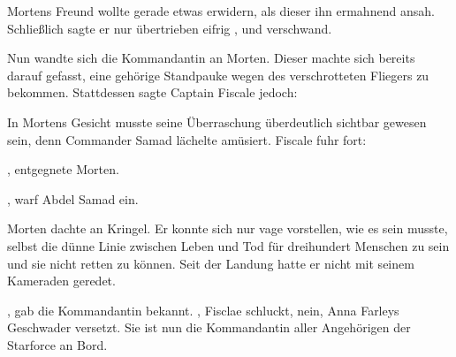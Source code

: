 \par

Mortens Freund wollte gerade etwas erwidern, als dieser ihn ermahnend ansah. Schließlich sagte er nur übertrieben eifrig , und verschwand.

\par

Nun wandte sich die Kommandantin an Morten. Dieser machte sich bereits darauf gefasst, eine gehörige Standpauke wegen des verschrotteten Fliegers zu bekommen. Stattdessen sagte Captain Fiscale jedoch: 

\par

In Mortens Gesicht musste seine Überraschung überdeutlich sichtbar gewesen sein, denn Commander Samad lächelte amüsiert. Fiscale fuhr fort: 

\par

, entgegnete Morten. 

\par

, warf Abdel Samad ein. 

\par

Morten dachte an Kringel. Er konnte sich nur vage vorstellen, wie es sein musste, selbst die dünne Linie zwischen Leben und Tod für dreihundert Menschen zu sein und sie nicht retten zu können. Seit der Landung hatte er nicht mit seinem Kameraden geredet.

\par

, gab die Kommandantin bekannt. , Fisclae schluckt, {nein, Anna Farleys Geschwader versetzt. Sie ist nun die Kommandantin aller Angehörigen der Starforce an Bord.}

